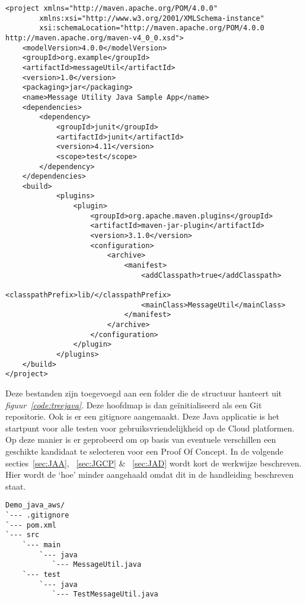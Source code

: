 \begin{lstlisting}
<project xmlns="http://maven.apache.org/POM/4.0.0" 
        xmlns:xsi="http://www.w3.org/2001/XMLSchema-instance"
        xsi:schemaLocation="http://maven.apache.org/POM/4.0.0 http://maven.apache.org/maven-v4_0_0.xsd">
    <modelVersion>4.0.0</modelVersion>
    <groupId>org.example</groupId>
    <artifactId>messageUtil</artifactId>
    <version>1.0</version>
    <packaging>jar</packaging>
    <name>Message Utility Java Sample App</name>
    <dependencies>
        <dependency>
            <groupId>junit</groupId>
            <artifactId>junit</artifactId>
            <version>4.11</version>
            <scope>test</scope>
        </dependency>	
    </dependencies>
    <build>
            <plugins>
                <plugin>
                    <groupId>org.apache.maven.plugins</groupId>
                    <artifactId>maven-jar-plugin</artifactId>
                    <version>3.1.0</version>
                    <configuration>
                        <archive>
                            <manifest>
                                <addClasspath>true</addClasspath>
                                <classpathPrefix>lib/</classpathPrefix>
                                <mainClass>MessageUtil</mainClass>
                            </manifest>
                        </archive>
                    </configuration>
                </plugin>
            </plugins>
    </build>
</project>
\end{lstlisting}

Deze bestanden zijn toegevoegd aan een folder die de structuur hanteert uit \emph{figuur~\ref{code:treejava}}. Deze hoofdmap is dan geïnitialiseerd als een Git repositorie. Ook is er een gitignore aangemaakt. Deze Java applicatie is het startpunt voor alle testen voor gebruiksvriendelijkheid op de Cloud platformen. Op deze manier is er geprobeerd om op basis van eventuele verschillen een geschikte kandidaat te selecteren voor een Proof Of Concept. In de volgende secties~\ref{sec:JAA}, ~\ref{sec:JGCP} \& ~\ref{sec:JAD} wordt kort de werkwijze beschreven. Hier wordt de ‘hoe’ minder aangehaald omdat dit in de handleiding beschreven staat.

\begin{lstlisting}
Demo_java_aws/
`--- .gitignore
`--- pom.xml
`--- src
    `--- main
        `--- java
           `--- MessageUtil.java
    `--- test
        `--- java
           `--- TestMessageUtil.java
\end{lstlisting}

